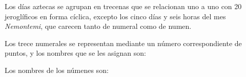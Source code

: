 Los d\'ias aztecas se agrupan en trecenas que se relacionan uno a uno con 20
jerogl\'ificos en forma c\'iclica, excepto los cinco d\'ias y seis horas del
mes {\it Nemontemi}, que carecen tanto de numeral como de numen.

Los trece numerales se representan mediante un n\'umero correspondiente de
puntos, y los nombres que se les asignan son:

\vskip1pc
\noindent\hfill\vbox{}\hfill\null

\eject

Los nombres de los n\'umenes son:

